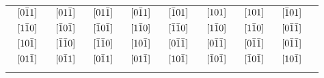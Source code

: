 \documentclass[%
 reprint,
superscriptaddress,
 amsmath,amssymb,
prb,
]{revtex4-1}
\begin{document}
\begin{table}[h!]
\begin{ruledtabular}
\begin{tabular}{c c c c c c c c c c c c c c c c c}
& $\hspace{-5pt}[0\bar{1}1]$ & & $\hspace{-5pt}[01\bar{1}]$& & $\hspace{-5pt}[01\bar{1}]$& & $\hspace{-5pt}[0\bar{1}1]$ & & $\hspace{-5pt}[\bar{1}01]$ & & $\hspace{-5pt}[101]$ & & $\hspace{-5pt}[101]$ & & $\hspace{-5pt}[\bar{1}01]$&\\ %
&  $\hspace{-5pt}[1\bar{1}0]$ & & $\hspace{-5pt}[\bar{1}0\bar{1}]$ & & $\hspace{-5pt}[\bar{1}0\bar{1}]$ & & $\hspace{-5pt}[1\bar{1}0]$  & & $\hspace{-5pt}[\bar{1}\bar{1}0]$ & & $\hspace{-5pt}[1\bar{1}0]$ & & $\hspace{-5pt}[1\bar{1}0]$ & & $\hspace{-5pt}[0\bar{1}\bar{1}]$ &\\ %
&  $\hspace{-5pt}[10\bar{1}]$ & & $\hspace{-5pt}[\bar{1}\bar{1}0]$ & & $\hspace{-5pt}[\bar{1}\bar{1}0]$ & & $\hspace{-5pt}[10\bar{1}]$ & & $\hspace{-5pt}[0\bar{1}\bar{1}]$ & & $\hspace{-5pt}[0\bar{1}\bar{1}]$ & & $\hspace{-5pt}[0\bar{1}\bar{1}]$ & & $\hspace{-5pt}[0\bar{1}\bar{1}]$ &\\ %
&  $\hspace{-5pt}[01\bar{1}]$ & & $\hspace{-5pt}[0\bar{1}1]$ & & $\hspace{-5pt}[0\bar{1}1]$ & &  $\hspace{-5pt}[01\bar{1}]$ & & $\hspace{-5pt}[10\bar{1}]$ & & $\hspace{-5pt}[\bar{1}0\bar{1}]$ & & $\hspace{-5pt}[\bar{1}0\bar{1}]$ & & $\hspace{-5pt}[10\bar{1}]$&\\ %
\colrule
& & & & & & & & & & & & & & & & \\

\end{tabular}
\end{ruledtabular}
\end{table}
\end{document}
